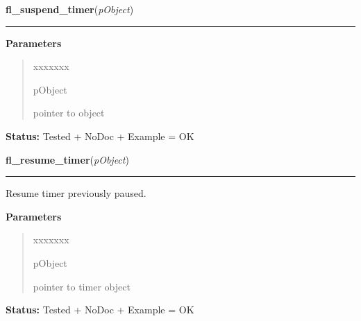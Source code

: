 \hspace{.8\funcindent}\begin{boxedminipage}{\funcwidth}

    \raggedright \textbf{fl\_suspend\_timer}(\textit{pObject})

    \vspace{-1.5ex}

    \rule{\textwidth}{0.5\fboxrule}
\setlength{\parskip}{2ex}
\setlength{\parskip}{1ex}
      \textbf{Parameters}
      \vspace{-1ex}

      \begin{quote}
        \begin{Ventry}{xxxxxxx}

          \item[pObject]

          pointer to object

        \end{Ventry}

      \end{quote}

\textbf{Status:} Tested + NoDoc + Example = OK



    \end{boxedminipage}

    \label{xformslib:library:fl_resume_timer}

    \vspace{0.5ex}

\hspace{.8\funcindent}\begin{boxedminipage}{\funcwidth}

    \raggedright \textbf{fl\_resume\_timer}(\textit{pObject})

    \vspace{-1.5ex}

    \rule{\textwidth}{0.5\fboxrule}
\setlength{\parskip}{2ex}
    Resume timer previously paused.

\setlength{\parskip}{1ex}
      \textbf{Parameters}
      \vspace{-1ex}

      \begin{quote}
        \begin{Ventry}{xxxxxxx}

          \item[pObject]

          pointer to timer object

        \end{Ventry}

      \end{quote}

\textbf{Status:} Tested + NoDoc + Example = OK



    \end{boxedminipage}

